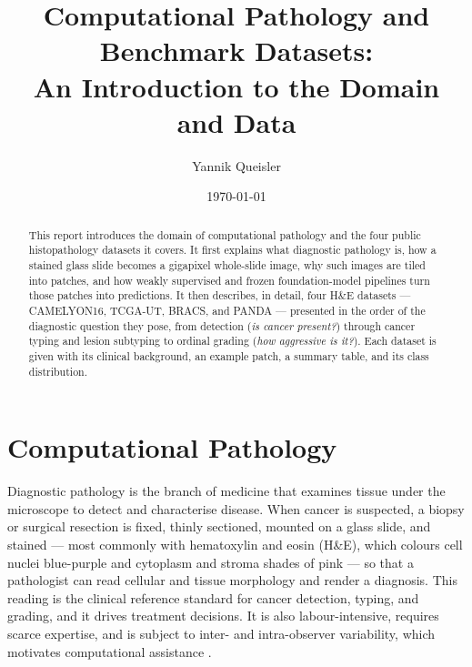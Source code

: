 \documentclass[11pt]{article}
\title{Computational Pathology and Benchmark Datasets:\\
An Introduction to the Domain and Data}
\author{Yannik Queisler}
\date{\today}
\begin{document}
\maketitle

\begin{abstract}
\begingroup
\setlength{\emergencystretch}{2em}
\noindent This report introduces the domain of computational pathology and the four public
histopathology datasets it covers. It first explains what diagnostic pathology is, how a stained glass slide becomes a
gigapixel whole-slide image, why such images are tiled into patches, and how weakly supervised and
frozen foundation-model pipelines turn those patches into predictions. It then describes, in detail,
four H\&E datasets --- CAMELYON16, TCGA-UT, BRACS, and PANDA --- presented in the order of the
diagnostic question they pose, from detection (\emph{is cancer present?}) through cancer typing and
lesion subtyping to ordinal grading (\emph{how aggressive is it?}). Each dataset is given with its
clinical background, an example patch, a summary table, and its class distribution.
\par
\endgroup
\end{abstract}

\setcounter{tocdepth}{2}
\tableofcontents
\clearpage

\section{Computational Pathology}
\label{sec:cpath}
Diagnostic pathology is the branch of medicine that examines tissue under the microscope to detect
and characterise disease. When cancer is suspected, a biopsy or surgical resection is fixed, thinly
sectioned, mounted on a glass slide, and stained --- most commonly with hematoxylin and eosin
(H\&E), which colours cell nuclei blue-purple and cytoplasm and stroma shades of pink --- so that a
pathologist can read cellular and tissue morphology and render a diagnosis. This reading is the
clinical reference standard for cancer detection, typing, and grading, and it drives treatment
decisions. It is also labour-intensive, requires scarce expertise, and is subject to inter- and
intra-observer variability, which motivates computational assistance
\citep{madabhushi2016imageAnalysis,song2023aiPathology}.
\end{document}
